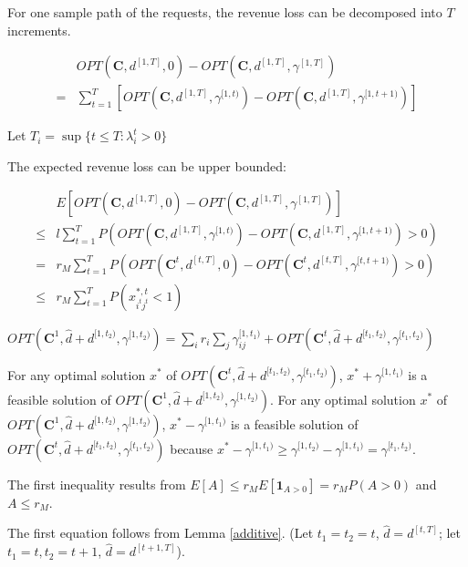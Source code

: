 For one sample path of the requests, the revenue loss can be decomposed into $T$ increments.

\begin{align*}
    & OPT(\bm{C}, d^{[1, T]}, 0) - OPT(\bm{C}, d^{[1, T]}, \gamma^{[1, T]}) \\
 = & \sum_{t=1}^{T} [OPT(\bm{C}, d^{[1,T]}, \gamma^{[1,t)}) - OPT(\bm{C}, d^{[1,T]}, \gamma^{[1,t+1)})]
\end{align*}


Let $T_{i} = \sup\{t \leq T: \lambda_{i}^{t}> 0\}$

The expected revenue loss can be upper bounded:

\begin{align*}
    & E[OPT(\bm{C}, d^{[1, T]}, 0) - OPT(\bm{C}, d^{[1, T]}, \gamma^{[1, T]})] \\
 \leq & l \sum_{t=1}^{T} P(OPT(\bm{C}, d^{[1, T]}, \gamma^{[1,t)}) - OPT(\bm{C}, d^{[1, T]}, \gamma^{[1,t+1)}) > 0) \\
 = & r_{M} \sum_{t=1}^{T} P(OPT(\bm{C}^{t}, d^{[t, T]}, 0) - OPT(\bm{C}^{t}, d^{[t, T]}, \gamma^{[t,t+1)}) > 0) \\
 \leq & r_{M}  \sum_{t=1}^{T} P(x_{i^{t}j^{t}}^{*,t} <1)
\end{align*}


\begin{lem}\label{additive}
$OPT(\bm{C}^{1}, \hat{d} + d^{[1, t_2)} , \gamma^{[1, t_2)}) = \sum_{i} r_{i} \sum_{j} \gamma_{ij}^{[1, t_1)} + OPT(\bm{C}^{t}, \hat{d}+d^{[t_1, t_2)}, \gamma^{[t_1, t_2)})$
\end{lem}

For any optimal solution $x^{*}$ of $OPT(\bm{C}^{t}, \hat{d}+d^{[t_1, t_2)}, \gamma^{[t_1, t_2)})$, $x^{*} + \gamma^{[1, t_1)}$ is a feasible solution of $OPT(\bm{C}^{1}, \hat{d}+d^{[1, t_2)}, \gamma^{[1, t_2)})$. For any optimal solution $x^{*}$ of $OPT(\bm{C}^{1}, \hat{d}+d^{[1, t_2)}, \gamma^{[1, t_2)})$, $x^{*}- \gamma^{[1, t_1)}$ is a feasible solution of $OPT(\bm{C}^{t}, \hat{d}+d^{[t_1, t_2)}, \gamma^{[t_1, t_2)})$ because $x^{*}- \gamma^{[1, t_1)} \geq \gamma^{[1, t_{2})}- \gamma^{[1, t_1)} = \gamma^{[t_1, t_2)}$.


The first inequality results from $E[A] \leq r_{M} E[\bm{1}_{A>0}] = r_{M} P(A>0)$ and $A \leq r_{M}$.

The first equation follows from Lemma \ref{additive}. (Let $t_1 = t_2 = t$, $\hat{d} = d^{[t, T]}$; let $t_1 = t, t_2 = t+1$, $\hat{d} = d^{[t+1, T]}$).

